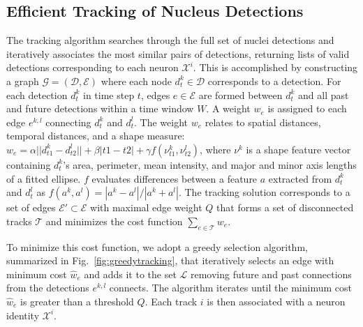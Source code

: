 \vspace{-3mm}
\subsection{Efficient Tracking of Nucleus Detections}
\label{sec:tracking}
\vspace{-2mm}

The tracking algorithm searches through the full
set of nuclei detections and iteratively
associates the most similar pairs of detections,
returning lists of valid detections corresponding
to each neuron $\mathcal{X}^i$.  This is
accomplished by constructing a graph
$\mathcal{G}=(\mathcal{D},\mathcal{E})$ where each
node $d^k_t \in \mathcal{D}$ corresponds to a
detection.  For each detection $d^k_t$ in time
step $t$, edges $e \in \mathcal{E}$ are formed
between $d^k_t$ and all past and future detections
within a time window $W$.  A weight $w_e$ is
assigned to each edge $e^{k,l}$ connecting $d^k_t$
and $d^l_t$. The weight $w_e$ relates to spatial
distances, temporal distances, and a shape
measure: $w_{e} = \alpha || d^k_{t1} - d^l_{t2} ||
+ \beta |t1 - t2| + \gamma f(\nu^k_{t1},
\nu^l_{t2})$, where $\nu^k$ is a shape feature
vector containing $d^k_t$'s area, perimeter, mean
intensity, and major and minor axis lengths of a
fitted ellipse. $f$ evaluates differences between
a feature $a$ extracted from $d^k_t$ and $d^l_t$
as $f(a^k,a^l) = {|a^k - a^l|}/{|a^k + a^l|}$.
The tracking solution corresponds to a set of
edges $\mathcal{E'} \subset \mathcal{E}$ with
maximal edge weight $Q$ that forms a set of
disconnected tracks $\mathcal{T}$ and minimizes
the cost function $\sum_{e \in \mathcal{T}} w_e$.

To minimize this cost function, we adopt a greedy
selection algorithm, summarized in
Fig.~\ref{fig:greedytracking}, that iteratively
selects an edge with minimum cost $\hat w_e$ and
adds it to the set $\mathcal{L}$ removing future
and past connections from the detections $e^{k,l}$
connects.  The algorithm iterates until the
minimum cost $\hat w_e$ is greater than a
threshold $Q$.  Each track $i$ is then associated
with a neuron identity $\mathcal{X}^i$.




